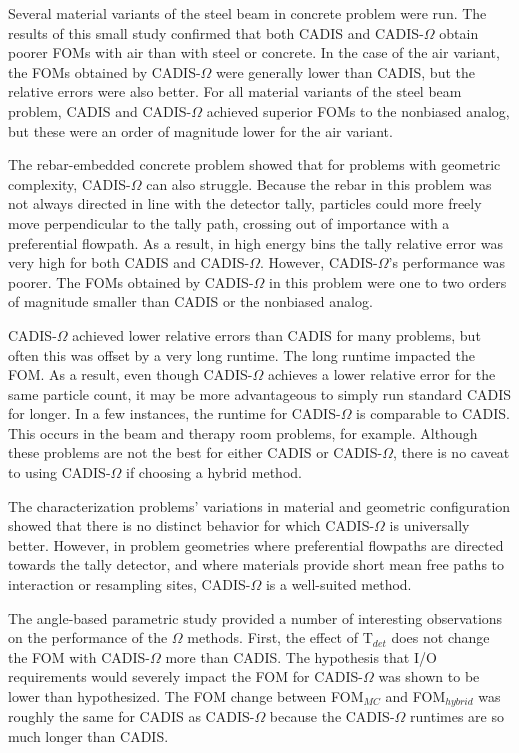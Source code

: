 \documentclass[12pt]{article}
\begin{document}
Several material variants of the steel beam in concrete problem were run. The
results of this small study confirmed that both CADIS and CADIS-$\Omega$ obtain
poorer FOMs with air than with steel or concrete. In the case of the air
variant, the FOMs obtained by CADIS-$\Omega$ were generally lower than CADIS,
but the relative errors were also better. For all material variants of the steel
beam problem, CADIS and CADIS-$\Omega$ achieved superior FOMs to the nonbiased
analog, but these were an order of magnitude lower for the air variant.

The rebar-embedded concrete problem showed that for problems with
geometric complexity, CADIS-$\Omega$ can also struggle. Because the rebar in
this problem was not always directed in line with the detector tally, particles
could more freely move perpendicular to the tally path, crossing out of
importance with a preferential flowpath. As a result, in high energy bins the
tally relative error was very high for both CADIS and CADIS-$\Omega$. However,
CADIS-$\Omega$'s performance was poorer. The FOMs obtained by CADIS-$\Omega$ in
this problem were one to two orders of magnitude smaller than CADIS or the
nonbiased analog.

CADIS-$\Omega$ achieved lower relative errors than CADIS for many problems, but
often this was offset by a very long runtime. The long runtime impacted the FOM.
As a result, even though CADIS-$\Omega$ achieves a lower relative error for the
same particle count, it may be more advantageous to simply run standard CADIS
for longer. In a few instances, the runtime for CADIS-$\Omega$ is comparable to
CADIS. This occurs in the beam and therapy room problems, for example. Although
these problems are not the best for either CADIS or CADIS-$\Omega$, there is no
caveat to using CADIS-$\Omega$ if choosing a hybrid method.

The characterization problems' variations in material and geometric
configuration showed that there is no distinct behavior for which CADIS-$\Omega$
is universally better. However,
in problem geometries where preferential flowpaths are directed
towards the tally detector, and where materials provide short mean free paths to
interaction or resampling sites, CADIS-$\Omega$ is a well-suited method.

The angle-based parametric study provided a number of interesting observations on
the performance of the $\Omega$ methods.
First, the effect of T$_{det}$ does not change the FOM with CADIS-$\Omega$ more
than CADIS. The hypothesis that I/O requirements would severely
impact the FOM for CADIS-$\Omega$ was shown to be lower than
hypothesized. The FOM change between
FOM$_{MC}$ and FOM$_{hybrid}$ was roughly the same for CADIS as CADIS-$\Omega$
because the CADIS-$\Omega$ runtimes are so much longer than CADIS.
\end{document}
